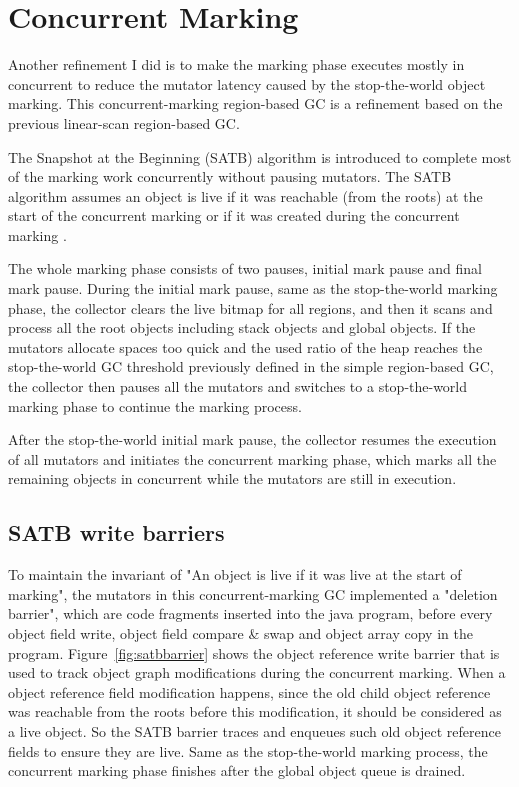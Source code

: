 \section{Concurrent Marking}
\label{sec:concmarkgc}

Another refinement I did is to make the marking phase executes mostly in concurrent to reduce the
mutator latency caused by the stop-the-world object marking.
This concurrent-marking region-based GC is a refinement based on the previous linear-scan region-based GC.

The Snapshot at the Beginning (SATB) algorithm \cite{yuasa1990real} is introduced to
complete most of the marking work concurrently without pausing mutators. The SATB algorithm assumes an object is live if it was reachable (from the roots)
at the start of the concurrent marking or if it was created during the concurrent marking \cite{yuasa1990real}.

The whole marking phase consists of two pauses, initial mark pause and final mark pause.
During the initial mark pause, same as the stop-the-world marking phase,
the collector clears the live bitmap for all regions,
and then it scans and process all the root objects including stack objects and global objects.
If the mutators allocate spaces too quick and the used ratio of the heap reaches
the stop-the-world GC threshold previously defined in the simple region-based GC, the
collector then pauses all the mutators and switches to a stop-the-world marking phase
to continue the marking process.

After the stop-the-world initial mark pause, the collector resumes the execution of all mutators and
initiates the concurrent marking phase, which marks all the remaining objects in concurrent
while the mutators are still in execution.

\subsection{SATB write barriers}

To maintain the invariant of "An object is live if it was live at the start of marking",
the mutators in this concurrent-marking GC implemented a "deletion barrier", which are code
fragments inserted into the java program, before every object field write, object field compare \& swap
and object array copy in the program. Figure~\ref{fig:satbbarrier} shows the object reference write barrier that is used
to track object graph modifications during the concurrent marking.
When a object reference field modification happens, since the old child object reference
was reachable from the roots before this modification, it should be considered as a live object.
So the SATB barrier traces and enqueues such old object reference fields to ensure they are live.
Same as the stop-the-world marking process, the concurrent marking phase finishes after
the global object queue is drained.

